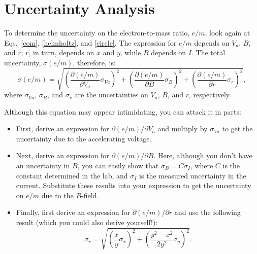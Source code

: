 \documentclass{tufte-handout}
\begin{document}
\section{Uncertainty Analysis}

To determine the uncertainty on the electron-to-mass ratio, $e/m$, look again at
Eqs.~\ref{eom}, \ref{helmholtz}, and \ref{circle}. The expression for $e/m$
depends on $V_a$, $B$, and $r$; $r$, in turn, depends on $x$ and $y$, while $B$
depends on $I$.
The total uncertainty, $\sigma(e/m)$, therefore, is:
\begin{equation}
\sigma(e/m) = \sqrt{ 
  \left(\frac{\partial(e/m)}{\partial V_a} \sigma_{Va}\right)^2 + 
  \left(\frac{\partial(e/m)}{\partial B} \sigma_B\right)^2 + 
  \left(\frac{\partial(e/m)}{\partial r} \sigma_r\right)^2 },
\label{eq:sigma_eom}
\end{equation}
\noindent where $\sigma_{Va}$, $\sigma_B$, and $\sigma_r$ are the uncertainties
on $V_a$, $B$, and $r$, respectively. 

Although this equation may appear intimidating, you can attack it in parts:
\begin{itemize}
  \item First, derive an expression for $\partial(e/m)/\partial V_a$ and
    multiply by $\sigma_{Va}$ to get the uncertainty due to the accelerating
    voltage.
  \item Next, derive an expression for $\partial(e/m)/\partial B$. Here,
    although you don't have an uncertainty in $B$, you can easily show that
    $\sigma_B = C\sigma_I$, where $C$ is the constant determined in the lab, and
    $\sigma_I$ is the measured uncertainty in the current. Substitute these
    results into your expression to get the uncertainty on $e/m$ due to the
    $B$-field.
  \item Finally, first derive an expression for $\partial(e/m)/\partial r$ and
    use the following result (which you could also derive yourself!):
    \begin{equation}
      \sigma_r = \sqrt{ \left(\frac{x}{y}\sigma_x\right)^2 +
        \left(\frac{y^2-x^2}{2y^2} \sigma_y\right)^2 }.
    \end{equation}
\end{itemize}
\end{document}
